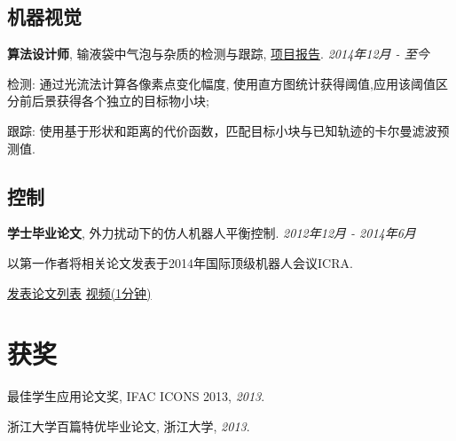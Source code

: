 \documentclass[letterpaper]{article}
\renewenvironment{itemize}{
  \begin{list}{}{
    \setlength{\leftmargin}{1.5em}
  }
}{
  \end{list}
}
\begin{document}
\subsection*{机器视觉}
\begin{itemize}
	\item[$\circ$] \textbf{算法设计师}, 输液袋中气泡与杂质的检测与跟踪, \href{http://yaliang-wang.tk/media/documents/papers/432\_final\_report.pdf}{\color[rgb]{0.2, 0.7, 0.7} 项目报告}. \hfill
	{\it  \footnotesize 2014年12月 - 至今} 
	\begin{itemize}
		\item 检测: 通过光流法计算各像素点变化幅度, 使用直方图统计获得阈值,应用该阈值区分前后景获得各个独立的目标物小块;
		\item 跟踪: 使用基于形状和距离的代价函数，匹配目标小块与已知轨迹的卡尔曼滤波预测值.
	\end{itemize}
\end{itemize}

\subsection*{控制}
\begin{itemize}
	\item[$\circ$] \textbf{学士毕业论文}, 外力扰动下的仿人机器人平衡控制. \hfill{\it \footnotesize 2012年12月 - 2014年6月}
	\begin{itemize}
		\item 以第一作者将相关论文发表于2014年国际顶级机器人会议ICRA.
		\item \href{http://yaliang-wang.tk/publications/}{\color[rgb]{0.2, 0.7, 0.7} 发表论文列表} \hspace{0.2in} \href{http://yaliang-wang.tk/icra2014-video/}{\color[rgb]{0.2, 0.7, 0.7} 视频(1分钟)}
	\end{itemize}
\end{itemize}

\section*{获奖}

\begin{itemize}
  \item 最佳学生应用论文奖, IFAC ICONS 2013, {\it  2013}.
  \item 浙江大学百篇特优毕业论文, 浙江大学, {\it  2013}.
\end{itemize}

\end{document}
